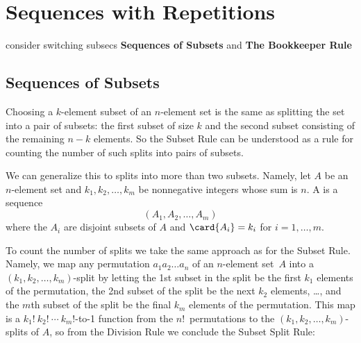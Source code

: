 \begin{problems}
  \practiceproblems

  \classproblems

  \homeworkproblems

  \examproblems

\end{problems}


\section{Sequences with Repetitions}\label{bookkeeper_sec}

\begin{editingnotes}
consider switching subsecs \textbf{Sequences of Subsets} and \textbf{The Bookkeeper Rule}
\end{editingnotes}

\subsection{Sequences of Subsets}

Choosing a $k$-element subset of an $n$-element set is the same as
splitting the set into a pair of subsets: the first subset of size $k$ and
the second subset consisting of the remaining $n-k$ elements.  So the
Subset Rule can be understood as a rule for counting the number of such
splits into pairs of subsets.

We can generalize this to splits into more than two subsets.  Namely, let
$A$ be an $n$-element set and $k_1,k_2, \dots, k_m$ be nonnegative integers
whose sum is $n$.  A  is a
sequence
\[
(A_1, A_2,\dots,A_m)
\]
where the $A_i$ are disjoint subsets of $A$ and $\card{A_i} = k_i$ for
$i=1,\dots,m$.

To count the number of splits we take the same approach as for the
Subset Rule.  Namely, we map any permutation $a_1a_2\dots a_n$ of an
$n$-element set~$A$ into a $(k_1,k_2, \dots, k_m)$-split by letting
the 1st subset in the split be the first $k_1$ elements of the
permutation, the 2nd subset of the split be the next $k_2$ elements,
\dots, and the $m$th subset of the split be the final $k_m$ elements
of the permutation.  This map is a
\hbox{$k_1!\ k_2!\ \cdots\ k_m!$-to-1} function from the
$n!$~permutations to the $(k_1,k_2, \dots, k_m)$-splits of $A$, so
from the Division Rule we conclude the Subset Split Rule:


